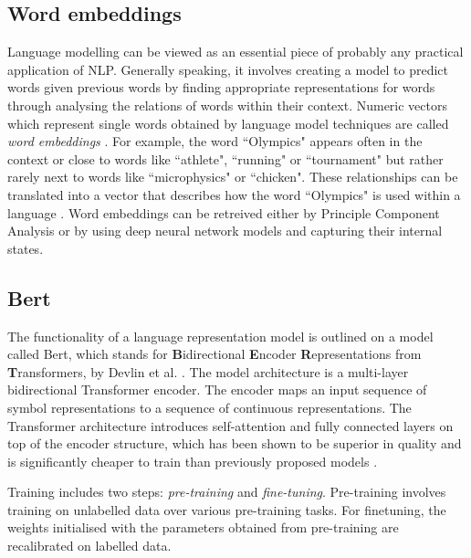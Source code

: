 \subsection{Word embeddings \label{sec:nlp_word_embeddings}}
Language modelling can be viewed as an essential piece of probably any practical application of NLP. Generally speaking, it involves creating a model to predict words given previous words by finding appropriate representations for words through analysing the relations of words within their context. Numeric vectors which represent single words obtained by language model techniques are called \textit{word embeddings} \cite{otter2020survey}. For example, the word ``Olympics" appears often in the context or close to words like ``athlete", ``running" or ``tournament" but rather rarely next to words like ``microphysics" or ``chicken". These relationships can be translated into a vector that describes how the word ``Olympics" is used within a language \cite{mittechnologyreviewkingqueen}. Word embeddings can be retreived either by Principle Component Analysis or by using deep neural network models and capturing their internal states.
\subsection{Bert \label{Bert}}
The functionality of a language representation model is outlined on a model called Bert, which stands for \textbf{B}idirectional \textbf{E}ncoder \textbf{R}epresentations from \textbf{T}ransformers, by Devlin et al. \cite{devlin2018bert}. The model architecture is a multi-layer bidirectional Transformer encoder. The encoder maps an input sequence of symbol representations to a sequence of continuous representations. The Transformer architecture introduces self-attention and fully connected layers on top of the encoder structure, which has been shown to be superior in quality and is significantly cheaper to train than previously proposed models \cite{vaswani2017attention}.

Training includes two steps: \textit{pre-training} and \textit{fine-tuning}. Pre-training involves training on unlabelled data over various pre-training tasks. For finetuning, the weights initialised with the parameters obtained from pre-training are recalibrated on labelled data.

